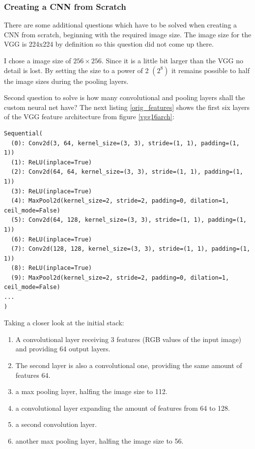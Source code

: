 \documentclass[paper=A4, DIV=10, parskip=half]{scrartcl}
\begin{document}
\subsubsection*{Creating a CNN from Scratch}

There are some additional questions which have to be solved when creating a CNN
from scratch, beginning with the required image size. The image size for the VGG
is 224x224 by definition so this question did not come up there.

I chose a image size of $256\times256$. Since it is a little bit larger than the
VGG no detail is lost. By setting the size to a power of 2 $(2^8)$ it remains
possible to half the image sizes during the pooling layers.

Second question to solve is how many convolutional and pooling layers shall the
custom neural net have? The next listing \ref{orig_features} shows the first six
layers of the VGG feature architecture from figure \ref{vgg16arch}:

\begin{lstlisting}[caption=Original VGG16 Features, label=orig_features]
Sequential(
  (0): Conv2d(3, 64, kernel_size=(3, 3), stride=(1, 1), padding=(1, 1))
  (1): ReLU(inplace=True)
  (2): Conv2d(64, 64, kernel_size=(3, 3), stride=(1, 1), padding=(1, 1))
  (3): ReLU(inplace=True)
  (4): MaxPool2d(kernel_size=2, stride=2, padding=0, dilation=1, ceil_mode=False)
  (5): Conv2d(64, 128, kernel_size=(3, 3), stride=(1, 1), padding=(1, 1))
  (6): ReLU(inplace=True)
  (7): Conv2d(128, 128, kernel_size=(3, 3), stride=(1, 1), padding=(1, 1))
  (8): ReLU(inplace=True)
  (9): MaxPool2d(kernel_size=2, stride=2, padding=0, dilation=1, ceil_mode=False)
...
)
\end{lstlisting}

Taking a closer look at the initial stack:

\begin{enumerate}
\item A convolutional layer receiving 3 features (RGB values of the input image)
and providing 64 output layers.
\item The second layer is also a convolutional one, providing the same amount of
features 64.
\item a max pooling layer, halfing the image size to 112.
\item a convolutional layer expanding the amount of features from 64 to 128.
\item a second convolution layer.
\item another max pooling layer, halfing the image size to 56.
\end{enumerate}
\end{document}
